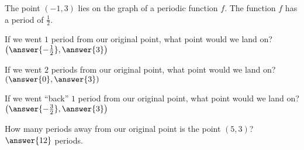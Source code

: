 \documentclass{ximera}
\author{David Kish}
\begin{document}
The point $(-1, 3)$ lies on the graph of a periodic function $f$. The function $f$ has a period of $\frac{1}{2}$.\\
\begin{exercise}
If we went $1$ period from our original point, what point would we land on?\\
$\left(\answer{-\frac{1}{2}},\answer{3}\right)$\\
\end{exercise}
\begin{exercise}
If we went $2$ periods from our original point, what point would we land on?\\
$\left(\answer{0},\answer{3}\right)$\\
\end{exercise}
\begin{exercise}
If we went ``back'' $1$ period from our original point, what point would we land on?\\
$\left(\answer{-\frac{3}{2}},\answer{3}\right)$\\
\end{exercise}
\begin{exercise}
How many periods away from our original point is the point $(5, 3)$?\\
$\answer{12}$ periods.
\end{exercise}
\end{document}
